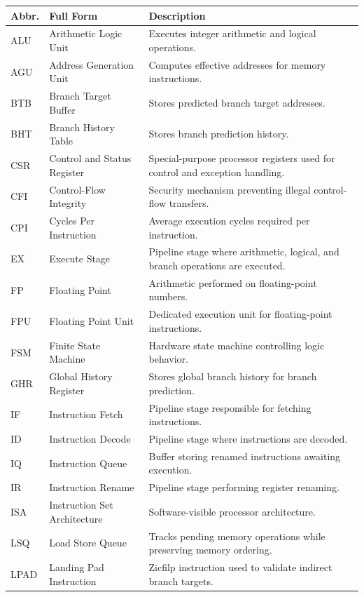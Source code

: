 \begingroup
\renewcommand{\arraystretch}{1.2}
\begin{longtable}{@{}p{}p{}p{}@{}}
\toprule
\textbf{Abbr.} & \textbf{Full Form} & \textbf{Description} \\
\midrule
\endhead
ALU & Arithmetic Logic Unit & Executes integer arithmetic and logical operations. \\
AGU & Address Generation Unit & Computes effective addresses for memory instructions. \\
BTB & Branch Target Buffer & Stores predicted branch target addresses. \\
BHT & Branch History Table & Stores branch prediction history. \\
CSR & Control and Status Register & Special-purpose processor registers used for control and exception handling. \\
CFI & Control-Flow Integrity & Security mechanism preventing illegal control-flow transfers. \\
CPI & Cycles Per Instruction & Average execution cycles required per instruction. \\
EX & Execute Stage & Pipeline stage where arithmetic, logical, and branch operations are executed. \\
FP & Floating Point & Arithmetic performed on floating-point numbers. \\
FPU & Floating Point Unit & Dedicated execution unit for floating-point instructions. \\
FSM & Finite State Machine & Hardware state machine controlling logic behavior. \\
GHR & Global History Register & Stores global branch history for branch prediction. \\
IF & Instruction Fetch & Pipeline stage responsible for fetching instructions. \\
ID & Instruction Decode & Pipeline stage where instructions are decoded. \\
IQ & Instruction Queue & Buffer storing renamed instructions awaiting execution. \\
IR & Instruction Rename & Pipeline stage performing register renaming. \\
ISA & Instruction Set Architecture & Software-visible processor architecture. \\
LSQ & Load Store Queue & Tracks pending memory operations while preserving memory ordering. \\
LPAD & Landing Pad Instruction & Zicfilp instruction used to validate indirect branch targets. \\

\end{longtable}
